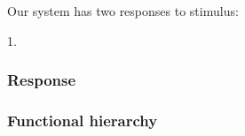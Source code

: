 Our system has two responses to stimulus:

1. 


\subsubsection{Response}


\subsubsection{Functional hierarchy}

